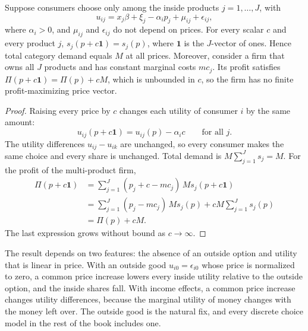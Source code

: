 \begin{proposition}\label{prop:06-outside}
Suppose consumers choose only among the inside products $j = 1, \dots, J$, with
\begin{equation*}
u_{ij} = x_j\beta + \xi_j - \alpha_i p_j + \mu_{ij} + \epsilon_{ij},
\end{equation*}
where $\alpha_i > 0$, and $\mu_{ij}$ and $\epsilon_{ij}$ do not depend on prices. For every scalar $c$ and
every product $j$, $s_j(p + c\mathbf{1}) = s_j(p)$, where $\mathbf{1}$ is the $J$-vector of ones. Hence total
category demand equals $M$ at all prices. Moreover, consider a firm that owns all $J$ products and has constant
marginal costs $mc_j$. Its profit satisfies $\Pi(p + c\mathbf{1}) = \Pi(p) + cM$, which is unbounded in $c$, so
the firm has no finite profit-maximizing price vector.
\end{proposition}

\begin{proof}
Raising every price by $c$ changes each utility of consumer $i$ by the same amount:
\begin{equation*}
u_{ij}(p + c\mathbf{1}) = u_{ij}(p) - \alpha_i c \qquad \text{for all } j.
\end{equation*}
The utility differences $u_{ij} - u_{ik}$ are unchanged, so every consumer makes the same choice and every share
is unchanged. Total demand is $M\sum_{j=1}^J s_j = M$. For the profit of the multi-product firm,
\begin{align*}
\Pi(p + c\mathbf{1}) &= \sum_{j=1}^J (p_j + c - mc_j)\,M s_j(p + c\mathbf{1}) \\
&= \sum_{j=1}^J (p_j - mc_j)\,M s_j(p) + cM\sum_{j=1}^J s_j(p) \\
&= \Pi(p) + cM .
\end{align*}
The last expression grows without bound as $c \to \infty$.
\end{proof}

The result depends on two features: the absence of an outside option and utility that is linear in price.
With an outside good $u_{i0} = \epsilon_{i0}$ whose price is normalized to zero, a common price increase lowers
every inside utility relative to the outside option, and the inside shares fall. With income effects, a
common price increase changes utility differences, because the marginal utility of money changes with the
money left over. The outside good is the natural fix, and every discrete choice model in the rest of the book includes one.

